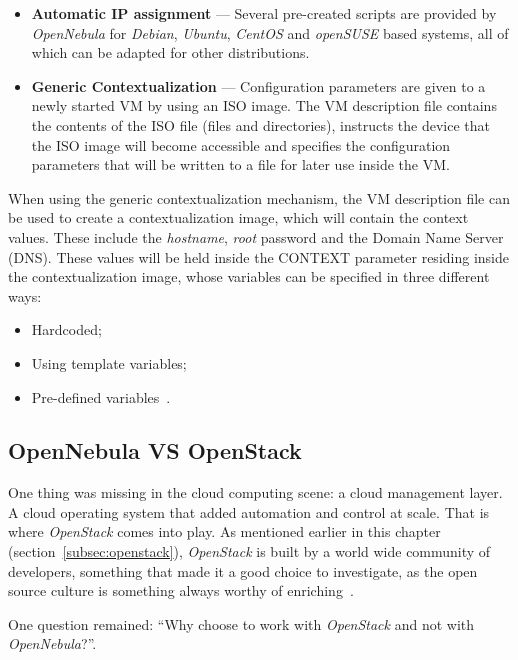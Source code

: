 \begin{itemize}
\item \textbf{Automatic IP assignment} --- Several pre-created scripts are provided by \textit{OpenNebula} for \textit{Debian}, \textit{Ubuntu}, \textit{CentOS} and \textit{openSUSE} based systems, all of which can be adapted for other distributions.
\item \textbf{Generic Contextualization} --- Configuration parameters are given to a newly started VM by using an ISO image. The VM description file contains the contents of the ISO file (files and directories), instructs the device that the ISO image will become accessible and specifies the configuration parameters that will be written to a file for later use inside the VM.
\end{itemize}

When using the generic contextualization mechanism, the VM description file can be used to create a contextualization image, which will contain the context values. These include the \textit{hostname}, \textit{root} password and the Domain Name Server (DNS). These values will be held inside the CONTEXT parameter residing inside the contextualization image, whose variables can be specified in three different ways:

\begin{itemize}
\item Hardcoded;
\item Using template variables;
\item Pre-defined variables~\cite{nebula-contextualization}.
\end{itemize}

\subsection{OpenNebula VS OpenStack}\label{subsec:nebula-vs-stack}

One thing was missing in the cloud computing scene: a cloud management layer. A cloud operating system that added automation and control at scale. That is where \textit{OpenStack} comes into play. As mentioned earlier in this chapter (section~\ref{subsec:openstack}), \textit{OpenStack} is built by a world wide community of developers, something that made it a good choice to investigate, as the open source culture is something always worthy of enriching~\cite{stackgithub}.

One question remained: ``Why choose to work with \textit{OpenStack} and not with \textit{OpenNebula}?''.

